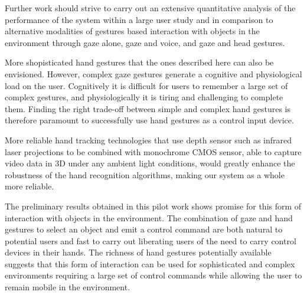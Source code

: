 \documentclass[jou,a4paper,notxfonts]{apa}
\begin{document}
Further work should strive to carry out an extensive quantitative analysis of the performance of the system within a
large user study and in comparison to alternative modalities of gestures based interaction with objects in the environment through gaze alone, gaze and voice, and gaze and head gestures. 


More shopisticated hand gestures that the ones described here can also be envisioned. However, complex gaze gestures generate a
cognitive and physiological load on the user. Cognitively it is difficult for users to remember a large set of complex
gestures, and physiologically it is tiring and challenging to complete them. Finding the right trade-off between simple
and complex hand gestures is therefore paramount to successfully use hand gestures as a control input device.

More reliable hand tracking technologies that use depth sensor such as  infrared laser projections to be combined with monochrome CMOS sensor, able to capture video data in 3D under any ambient light conditions, would greatly enhance the robustness of the hand recognition algorithms, making our system as a whole more reliable.


The preliminary results obtained  in this pilot work shows promise for this form of interaction with objects in the
environment. The combination of gaze and hand gestures to select an object  and emit a control command are both natural 
to potential users and fast to carry out liberating users of the need to carry control devices in their hands. The richness of hand gestures potentially available suggests that this form of interaction can be used for sophisticated and complex environments requiring  a large set of control commands while allowing the user to remain mobile in the environment.







\end{document}
